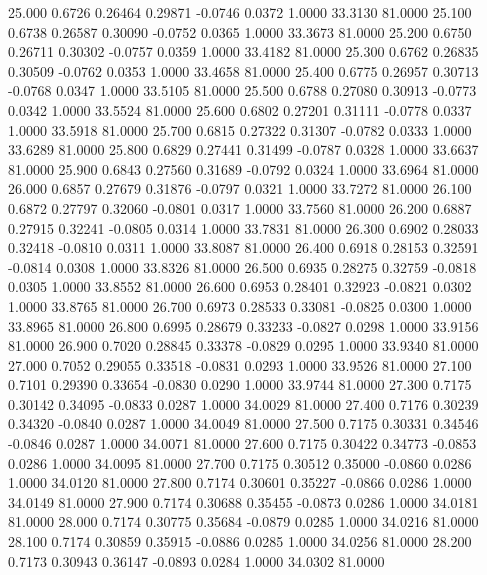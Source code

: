   25.000   0.6726   0.26464   0.29871  -0.0746   0.0372   1.0000  33.3130  81.0000
  25.100   0.6738   0.26587   0.30090  -0.0752   0.0365   1.0000  33.3673  81.0000
  25.200   0.6750   0.26711   0.30302  -0.0757   0.0359   1.0000  33.4182  81.0000
  25.300   0.6762   0.26835   0.30509  -0.0762   0.0353   1.0000  33.4658  81.0000
  25.400   0.6775   0.26957   0.30713  -0.0768   0.0347   1.0000  33.5105  81.0000
  25.500   0.6788   0.27080   0.30913  -0.0773   0.0342   1.0000  33.5524  81.0000
  25.600   0.6802   0.27201   0.31111  -0.0778   0.0337   1.0000  33.5918  81.0000
  25.700   0.6815   0.27322   0.31307  -0.0782   0.0333   1.0000  33.6289  81.0000
  25.800   0.6829   0.27441   0.31499  -0.0787   0.0328   1.0000  33.6637  81.0000
  25.900   0.6843   0.27560   0.31689  -0.0792   0.0324   1.0000  33.6964  81.0000
  26.000   0.6857   0.27679   0.31876  -0.0797   0.0321   1.0000  33.7272  81.0000
  26.100   0.6872   0.27797   0.32060  -0.0801   0.0317   1.0000  33.7560  81.0000
  26.200   0.6887   0.27915   0.32241  -0.0805   0.0314   1.0000  33.7831  81.0000
  26.300   0.6902   0.28033   0.32418  -0.0810   0.0311   1.0000  33.8087  81.0000
  26.400   0.6918   0.28153   0.32591  -0.0814   0.0308   1.0000  33.8326  81.0000
  26.500   0.6935   0.28275   0.32759  -0.0818   0.0305   1.0000  33.8552  81.0000
  26.600   0.6953   0.28401   0.32923  -0.0821   0.0302   1.0000  33.8765  81.0000
  26.700   0.6973   0.28533   0.33081  -0.0825   0.0300   1.0000  33.8965  81.0000
  26.800   0.6995   0.28679   0.33233  -0.0827   0.0298   1.0000  33.9156  81.0000
  26.900   0.7020   0.28845   0.33378  -0.0829   0.0295   1.0000  33.9340  81.0000
  27.000   0.7052   0.29055   0.33518  -0.0831   0.0293   1.0000  33.9526  81.0000
  27.100   0.7101   0.29390   0.33654  -0.0830   0.0290   1.0000  33.9744  81.0000
  27.300   0.7175   0.30142   0.34095  -0.0833   0.0287   1.0000  34.0029  81.0000
  27.400   0.7176   0.30239   0.34320  -0.0840   0.0287   1.0000  34.0049  81.0000
  27.500   0.7175   0.30331   0.34546  -0.0846   0.0287   1.0000  34.0071  81.0000
  27.600   0.7175   0.30422   0.34773  -0.0853   0.0286   1.0000  34.0095  81.0000
  27.700   0.7175   0.30512   0.35000  -0.0860   0.0286   1.0000  34.0120  81.0000
  27.800   0.7174   0.30601   0.35227  -0.0866   0.0286   1.0000  34.0149  81.0000
  27.900   0.7174   0.30688   0.35455  -0.0873   0.0286   1.0000  34.0181  81.0000
  28.000   0.7174   0.30775   0.35684  -0.0879   0.0285   1.0000  34.0216  81.0000
  28.100   0.7174   0.30859   0.35915  -0.0886   0.0285   1.0000  34.0256  81.0000
  28.200   0.7173   0.30943   0.36147  -0.0893   0.0284   1.0000  34.0302  81.0000
